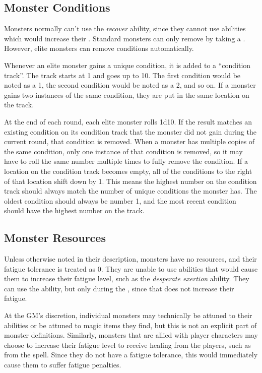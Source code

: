         \subsection{Monster Conditions}\label{Monster Conditions}
            Monsters normally can't use the \textit{recover} ability, since they cannot use abilities which would increase their .
            Standard monsters can only remove  by taking a .
            However, elite monsters can remove conditions automatically.

            Whenever an elite monster gains a unique condition, it is added to a ``condition track''.
            The track starts at 1 and goes up to 10.
            The first condition would be noted as a 1, the second condition would be noted as a 2, and so on.
            If a monster gains two instances of the same condition, they are put in the same location on the track.

            At the end of each round, each elite monster rolls 1d10.
            If the result matches an existing condition on its condition track that the monster did not gain during the current round, that condition is removed.
            When a monster has multiple copies of the same condition, only one instance of that condition is removed, so it may have to roll the same number multiple times to fully remove the condition.
            If a location on the condition track becomes empty, all of the conditions to the right of that location shift down by 1.
            This means the highest number on the condition track should always match the number of unique conditions the monster has.
            The oldest condition should always be number 1, and the most recent condition should have the highest number on the track.

        \subsection{Monster Resources}
            Unless otherwise noted in their description, monsters have no resources, and their fatigue tolerance is treated as 0.
            They are unable to use abilities that would cause them to increase their fatigue level, such as the \textit{desperate exertion} ability.
            They can use the  ability, but only during the , since that does not increase their fatigue.

            At the GM's discretion, individual monsters may technically be attuned to their abilities or be attuned to magic items they find, but this is not an explicit part of monster definitions.
            Similarly, monsters that are allied with player characters may choose to increase their fatigue level to receive healing from the players, such as from the  spell.
            Since they do not have a fatigue tolerance, this would immediately cause them to suffer fatigue penalties.

